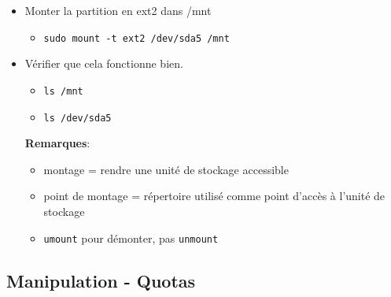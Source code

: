 \documentclass[a4paper]{article}
\begin{document}
\begin{itemize}

\item Monter la partition en ext2 dans /mnt
\begin{example}
    \begin{itemize}
        \item \texttt{sudo mount -t ext2 /dev/sda5 /mnt}
    \end{itemize}
\end{example}

\item Vérifier que cela fonctionne bien.
\begin{example}
    \begin{itemize}
        \item \texttt{ls /mnt}
        \item \texttt{ls /dev/sda5}
    \end{itemize}
\end{example}

\textbf{Remarques}:
\begin{itemize}
    \item montage = rendre une unité de stockage accessible
    \item point de montage = répertoire utilisé comme point d'accès à l'unité de stockage
    \item \texttt{umount} pour démonter, pas \texttt{unmount}
\end{itemize}

\end{itemize}










\subsection{Manipulation - Quotas}
\end{document}
